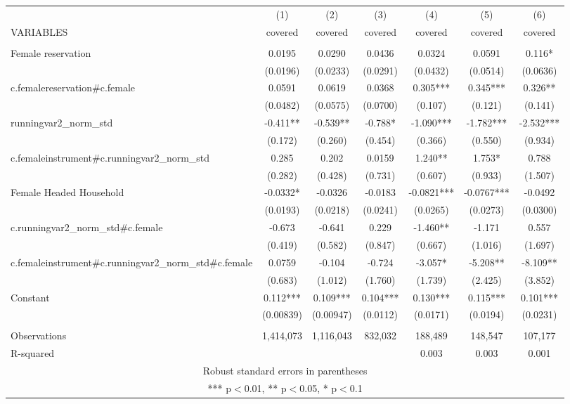 \begin{tabular}{lcccccc} \hline
 & (1) & (2) & (3) & (4) & (5) & (6) \\
VARIABLES & covered & covered & covered & covered & covered & covered \\ \hline
 &  &  &  &  &  &  \\
Female reservation & 0.0195 & 0.0290 & 0.0436 & 0.0324 & 0.0591 & 0.116* \\
 & (0.0196) & (0.0233) & (0.0291) & (0.0432) & (0.0514) & (0.0636) \\
c.femalereservation\#c.female & 0.0591 & 0.0619 & 0.0368 & 0.305*** & 0.345*** & 0.326** \\
 & (0.0482) & (0.0575) & (0.0700) & (0.107) & (0.121) & (0.141) \\
runningvar2\_norm\_std & -0.411** & -0.539** & -0.788* & -1.090*** & -1.782*** & -2.532*** \\
 & (0.172) & (0.260) & (0.454) & (0.366) & (0.550) & (0.934) \\
c.femaleinstrument\#c.runningvar2\_norm\_std & 0.285 & 0.202 & 0.0159 & 1.240** & 1.753* & 0.788 \\
 & (0.282) & (0.428) & (0.731) & (0.607) & (0.933) & (1.507) \\
Female Headed Household & -0.0332* & -0.0326 & -0.0183 & -0.0821*** & -0.0767*** & -0.0492 \\
 & (0.0193) & (0.0218) & (0.0241) & (0.0265) & (0.0273) & (0.0300) \\
c.runningvar2\_norm\_std\#c.female & -0.673 & -0.641 & 0.229 & -1.460** & -1.171 & 0.557 \\
 & (0.419) & (0.582) & (0.847) & (0.667) & (1.016) & (1.697) \\
c.femaleinstrument\#c.runningvar2\_norm\_std\#c.female & 0.0759 & -0.104 & -0.724 & -3.057* & -5.208** & -8.109** \\
 & (0.683) & (1.012) & (1.760) & (1.739) & (2.425) & (3.852) \\
Constant & 0.112*** & 0.109*** & 0.104*** & 0.130*** & 0.115*** & 0.101*** \\
 & (0.00839) & (0.00947) & (0.0112) & (0.0171) & (0.0194) & (0.0231) \\
 &  &  &  &  &  &  \\
Observations & 1,414,073 & 1,116,043 & 832,032 & 188,489 & 148,547 & 107,177 \\
 R-squared &  &  &  & 0.003 & 0.003 & 0.001 \\ \hline
\multicolumn{7}{c}{ Robust standard errors in parentheses} \\
\multicolumn{7}{c}{ *** p$<$0.01, ** p$<$0.05, * p$<$0.1} \\
\end{tabular}
